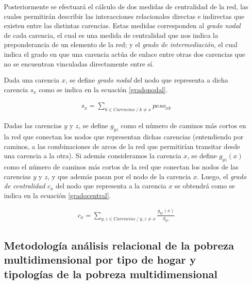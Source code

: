 \documentclass[12pt,letterpaper,spanish]{article}
\begin{document}
\begin{enumerate}
Posteriormente se efectuará el cálculo de dos medidas de centralidad de la red, las cuales permitirán describir las interacciones relacionales directas e indirectas que existen entre las distintas carencias. Estas medidas corresponden al \textit{grado nodal} de cada carencia, el cual es una medida de centralidad que nos indica la preponderancia de un elemento de la red; y el \textit{grado de intermediación}, el cual indica el grado en que una carencia actúa de enlace entre otras dos carencias que no se encuentran vinculadas directamente entre sí. 


Dada una carencia $x$, se define \textit{grado nodal} del nodo que representa a dicha carencia $s_{x}$ como se indica en la ecuación \ref{gradonodal}\cite{Opsahl2010NodePaths}\cite{CharuC.Aggarwal2011SocialAnalytics}.


\begin{equation} \label{gradonodal}
\begin{split}
s_{x}=\sum_{k\in Carencias\:/\:k\neq x}^{}peso_{xk}
\end{split}
\end{equation}


Dadas las carencias $y$ y $z$, se define $g_{yz}$ como el número de caminos más cortos en la red que conectan los nodos que representan dichas carencias (entendiendo por caminos, a las combinaciones de arcos de la red que permitirían transitar desde una carencia a la otra). Si además consideramos la carencia $x$, se define $g_{yz}(x)$ como el número de caminos más cortos de la red que conectan los nodos de las carencias $y$ y $z$, y que además pasan por el nodo de la carencia $x$. Luego, el \textit{grado de centralidad} $c_{x}$ del nodo que representa a la carencia $x$ se obtendrá como se indica en la ecuación \ref{gradocentral}\cite{Opsahl2010NodePaths}\cite{CharuC.Aggarwal2011SocialAnalytics}.


\begin{equation} \label{gradocentral}
\begin{split}
c_{x}=\sum_{y,z\in Carencias\:/\:y,z\neq x}^{}\frac{g_{yz}(x)}{g_{yz}}
\end{split}
\end{equation}







\end{enumerate}


\subsection{Metodología análisis relacional de la pobreza multidimensional por tipo de hogar y tipologías de la pobreza multidimensional}
\end{document}
